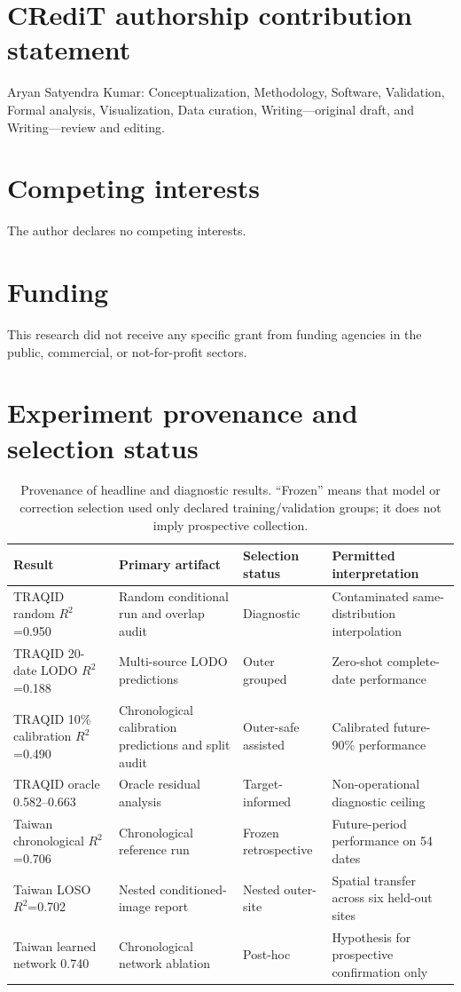 \documentclass[review,12pt,authoryear]{elsarticle}
\newcommand{\Rtwo}{\ensuremath{R^2}}
\begin{document}
\section*{CRediT authorship contribution statement}
Aryan Satyendra Kumar: Conceptualization, Methodology, Software, Validation,
Formal analysis, Visualization, Data curation, Writing---original draft, and
Writing---review and editing.

\section*{Competing interests}
The author declares no competing interests.

\section*{Funding}
This research did not receive any specific grant from funding agencies in the
public, commercial, or not-for-profit sectors.

\appendix

\section{Experiment provenance and selection status}
\label{app:provenance}

\begin{table}[H]
\centering
\caption{Provenance of headline and diagnostic results. ``Frozen'' means that
model or correction selection used only declared training/validation groups;
it does not imply prospective collection.}
\begin{adjustbox}{max width=\textwidth}
\begin{tabular}{P{3.0cm}P{4.4cm}P{2.2cm}P{5.2cm}}
\toprule
Result & Primary artifact & Selection status & Permitted interpretation \\
\midrule
TRAQID random \Rtwo=0.950 & Random conditional run and overlap audit & Diagnostic & Contaminated same-distribution interpolation \\
TRAQID 20-date LODO \Rtwo=0.188 & Multi-source LODO predictions & Outer grouped & Zero-shot complete-date performance \\
TRAQID 10\% calibration \Rtwo=0.490 & Chronological calibration predictions and split audit & Outer-safe assisted & Calibrated future-90\% performance \\
TRAQID oracle 0.582--0.663 & Oracle residual analysis & Target-informed & Non-operational diagnostic ceiling \\
Taiwan chronological \Rtwo=0.706 & Chronological reference run & Frozen retrospective & Future-period performance on 54 dates \\
Taiwan LOSO \Rtwo=0.702 & Nested conditioned-image report & Nested outer-site & Spatial transfer across six held-out sites \\
Taiwan learned network 0.740 & Chronological network ablation & Post-hoc & Hypothesis for prospective confirmation only \\
\bottomrule
\end{tabular}
\end{adjustbox}
\end{table}
\end{document}

